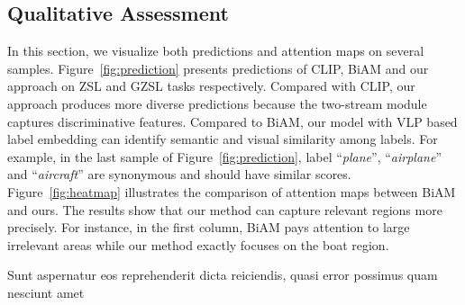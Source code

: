 \documentclass[letterpaper]{article} %
\begin{document}
\subsection{Qualitative Assessment}
In this section, we visualize both predictions and attention maps on several samples.
Figure~\ref{fig:prediction} presents predictions of CLIP, BiAM and our approach on ZSL and GZSL tasks respectively.
Compared with CLIP, our approach produces more diverse predictions because the two-stream module captures discriminative features.
Compared to BiAM, our model with VLP based label embedding can identify semantic and visual similarity among labels.
For example, in the last sample of Figure~\ref{fig:prediction},  label ``\textit{plane}'', ``\textit{airplane}'' and ``\textit{aircraft}'' are synonymous and should have similar scores.
Figure~\ref{fig:heatmap} illustrates the comparison of attention maps between BiAM and ours.
The results show that our method can capture relevant regions more precisely.
For instance, in the first column, BiAM pays attention to large irrelevant areas while our method exactly focuses on the boat region.



Sunt aspernatur eos reprehenderit dicta reiciendis, quasi error possimus quam nesciunt amet

\end{document}
